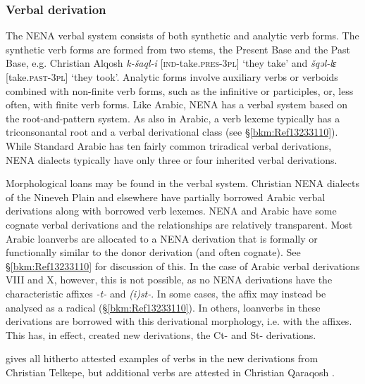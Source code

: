 \documentclass[output=paper]{langsci/langscibook}
\begin{document}
\subsubsection{\label{bkm:Ref13233345}Verbal derivation}

The NENA verbal system consists of both synthetic and analytic verb forms. The synthetic verb forms are formed from two stems, the Present Base and the Past Base, e.g. Christian Alqosh \textit{k\nobreakdash-šaql\nobreakdash-i} [\textsc{ind\nobreakdash-}take.\textsc{pres\nobreakdash-3pl]} ‘they take’ and \textit{šqəl\nobreakdash-lɛ} [take.\textsc{past\nobreakdash-3pl}] ‘they took’. Analytic forms involve auxiliary verbs or verboids combined with non-finite verb forms, such as the infinitive or participles, or, less often, with finite verb forms. Like Arabic, NENA has a verbal system based on the root-and-pattern system. As also in Arabic, a verb lexeme typically has a triconsonantal root and a verbal derivational class (see §\ref{bkm:Ref13233110}). While Standard Arabic has ten fairly common triradical verbal derivations, NENA dialects typically have only three or four inherited verbal derivations.

Morphological loans may be found in the verbal system. Christian NENA dialects of the Nineveh Plain and elsewhere have partially borrowed Arabic verbal derivations along with borrowed verb lexemes. NENA and Arabic have some cognate verbal derivations and the relationships are relatively transparent. Most Arabic loanverbs are allocated to a NENA derivation that is formally or functionally similar to the donor derivation (and often cognate). See §\ref{bkm:Ref13233110} for discussion of this. In the case of Arabic verbal derivations VIII and X, however, this is not possible, as no NENA derivations have the characteristic affixes \textit{{}-t-} and \textit{(i)st-}. In some cases, the affix may instead be analysed as a radical (§\ref{bkm:Ref13233110}). In others, loanverbs in these derivations are borrowed with this derivational morphology, i.e. with the affixes. This has, in effect, created new derivations, the Ct- and St- derivations.

 gives all hitherto attested examples of verbs in the new derivations from Christian Telkepe, but additional verbs are attested in Christian Qaraqosh \citep[130]{Khan2002}.
\end{document}
